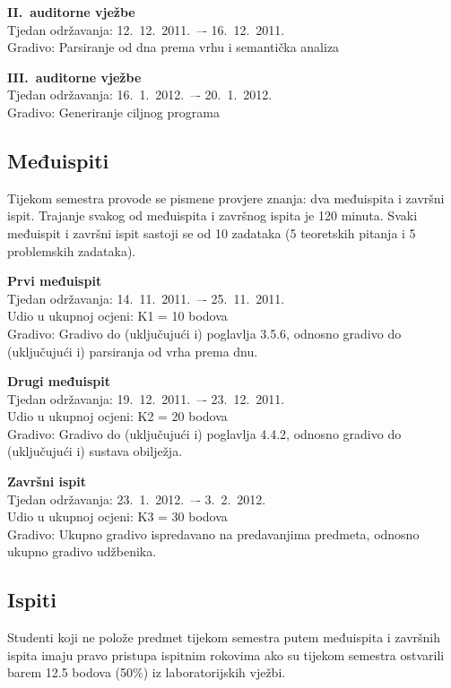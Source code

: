 \documentclass[times, 12pt, utf8]{book}
\begin{document}
\textbf{II.~auditorne vježbe} \\
Tjedan održavanja: 12.~12.~2011.~–- 16.~12.~2011. \\
Gradivo: Parsiranje od dna prema vrhu i semantička analiza

\textbf{III.~auditorne vježbe} \\
Tjedan održavanja: 16.~1.~2012.~–- 20.~1.~2012. \\
Gradivo: Generiranje ciljnog programa

\cleardoublepage  
{}  
{}
\subsection*{Međuispiti}

Tijekom semestra provode se pismene provjere znanja: dva međuispita i završni ispit.
Trajanje svakog od međuispita i završnog ispita je 120 minuta.
Svaki međuispit i završni ispit sastoji se od 10 zadataka (5 teoretskih pitanja i 5 problemskih zadataka).

\textbf{Prvi međuispit} \\
Tjedan održavanja: 14.~11.~2011.~–- 25.~11.~2011. \\
Udio u ukupnoj ocjeni: K1 = 10 bodova \\
Gradivo: Gradivo do (uključujući i) poglavlja 3.5.6, odnosno gradivo do (uključujući i) parsiranja od vrha prema dnu.

\textbf{Drugi međuispit} \\
Tjedan održavanja: 19.~12.~2011.~–- 23.~12.~2011. \\
Udio u ukupnoj ocjeni: K2 = 20 bodova \\
Gradivo: Gradivo do (uključujući i) poglavlja 4.4.2, odnosno gradivo do (uključujući i) sustava obilježja.

\textbf{Završni ispit} \\
Tjedan održavanja: 23.~1.~2012.~–- 3.~2.~2012. \\
Udio u ukupnoj ocjeni: K3 = 30 bodova \\
Gradivo: Ukupno gradivo ispredavano na predavanjima predmeta, odnosno ukupno gradivo udžbenika.

\cleardoublepage  
{}  
{}
\subsection*{Ispiti}

Studenti koji ne polože predmet tijekom semestra putem međuispita i završnih ispita imaju pravo pristupa ispitnim rokovima ako su tijekom semestra ostvarili barem 12.5 bodova (50\%) iz laboratorijskih vježbi.
\end{document}
